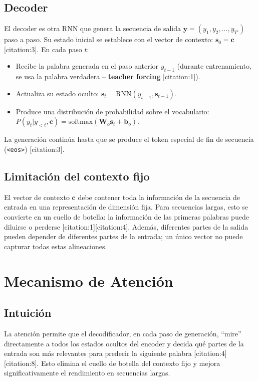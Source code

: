 \documentclass[12pt,a4paper,openany,oneside]{book}
\begin{document}
\subsection{Decoder}
El decoder es otra RNN que genera la secuencia de salida \(\mathbf{y} = (y_1, y_2, ..., y_{T'})\) paso a paso. Su estado inicial se establece con el vector de contexto: \(\mathbf{s}_0 = \mathbf{c}\) [citation:3]. En cada paso \(t\):
\begin{itemize}
    \item Recibe la palabra generada en el paso anterior \(y_{t-1}\) (durante entrenamiento, se usa la palabra verdadera – \textbf{teacher forcing} [citation:1]).
    \item Actualiza su estado oculto: \(\mathbf{s}_t = \text{RNN}(y_{t-1}, \mathbf{s}_{t-1})\).
    \item Produce una distribución de probabilidad sobre el vocabulario: \(P(y_t | y_{<t}, \mathbf{c}) = \text{softmax}(\mathbf{W}_o \mathbf{s}_t + \mathbf{b}_o)\).
\end{itemize}

La generación continúa hasta que se produce el token especial de fin de secuencia (\texttt{<eos>}) [citation:3].

\subsection{Limitación del contexto fijo}
El vector de contexto \(\mathbf{c}\) debe contener toda la información de la secuencia de entrada en una representación de dimensión fija. Para secuencias largas, esto se convierte en un cuello de botella: la información de las primeras palabras puede diluirse o perderse [citation:1][citation:4]. Además, diferentes partes de la salida pueden depender de diferentes partes de la entrada; un único vector no puede capturar todas estas alineaciones.

\section{Mecanismo de Atención}

\subsection{Intuición}
La atención permite que el decodificador, en cada paso de generación, ``mire'' directamente a todos los estados ocultos del encoder y decida qué partes de la entrada son más relevantes para predecir la siguiente palabra [citation:4][citation:8]. Esto elimina el cuello de botella del contexto fijo y mejora significativamente el rendimiento en secuencias largas.
\end{document}

